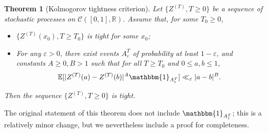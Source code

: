 \documentclass{article}
\newcommand{\1}{\mathds{1}}
\numberwithin{equation}{section}
\newcommand{\eps}{\varepsilon}
\renewcommand{\leq}{\leqslant}
\renewcommand{\geq}{\geqslant}
\newcommand{\E}{\mathbb{E}}
\newcommand{\R}{\mathbb{R}}
\theoremstyle{plain} %
\newtheorem{theorem}{Theorem}[section]
\begin{document}
\begin{theorem}[Kolmogorov tightness criterion]
\label{kolmo}
Let $\{Z^{(T)}, T \geq 0\}$ be a sequence of stochastic processes on $\mathcal{C}([0, 1], \R)$. Assume that, for some $T_0 \geq 0$,
    \begin{itemize}
        \item $\{Z^{(T)}(x_0), T \geq T_0\}$ is tight for some $x_0$;
        \item For any $\eps > 0$, there exist events $A_\eps^T$ of probability at least $1 - \eps$, and constants  $A \geq 0, B > 1$ such that for all $T \geq T_0$ and $0 \leq a, b \leq 1$,
\begin{equation}
\label{prereq}
    \E[|Z^{(T)}(a) - Z^{(T)}(b)|^A \mathbbm{1}_{A_\eps^T}] \ll_{\eps} |a - b|^B.
\end{equation}
\end{itemize}
    Then the sequence $\{Z^{(T)}, T \geq 0\}$ is tight.
\end{theorem}

The original statement of this theorem does not include $\mathbbm{1}_{A_\eps^T}$; this is a relatively minor change, but we nevertheless include a proof for completeness.
\end{document}
